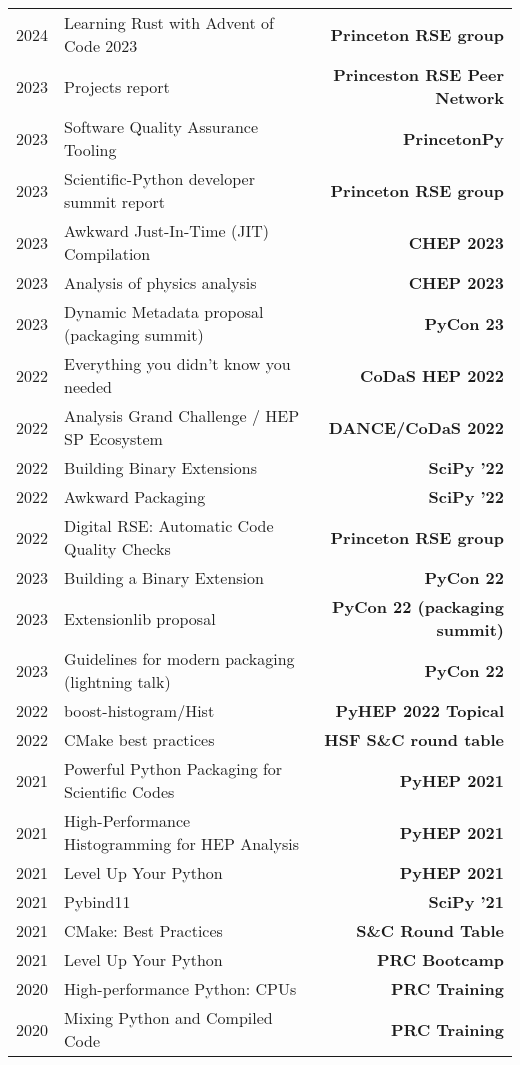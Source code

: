 \documentclass[10pt,letterpaper]{moderncv}
\begin{document}
\begin{tabularx}{\textwidth}{p{.33in}X>{\bfseries}r}
    2024 & Learning Rust with Advent of Code 2023 & Princeton RSE group \\
    2023 & Projects report & Princeston RSE Peer Network \\
    2023 & Software Quality Assurance Tooling & PrincetonPy \\
    2023 & Scientific-Python developer summit report & Princeton RSE group \\
    2023 & Awkward Just-In-Time (JIT) Compilation & CHEP 2023 \\
    2023 & Analysis of physics analysis & CHEP 2023 \\
    2023 & Dynamic Metadata proposal (packaging summit) & PyCon 23 \\
    2022 & Everything you didn't know you needed & CoDaS HEP 2022 \\
    2022 & Analysis Grand Challenge / HEP SP Ecosystem & DANCE/CoDaS 2022 \\
    2022 & Building Binary Extensions & SciPy '22 \\
    2022 & Awkward Packaging & SciPy '22 \\
    2022 & Digital RSE: Automatic Code Quality Checks & Princeton RSE group \\
    2023 & Building a Binary Extension & PyCon 22 \\
    2023 & Extensionlib proposal & PyCon 22 (packaging summit) \\
    2023 & Guidelines for modern packaging (lightning talk) & PyCon 22 \\
    2022 & boost-histogram/Hist & PyHEP 2022 Topical \\
    2022 & CMake best practices & HSF S\&C round table \\
	2021 & Powerful Python Packaging for Scientific Codes & PyHEP 2021 \\
	2021 & High-Performance Histogramming for HEP Analysis & PyHEP 2021 \\
	2021 & Level Up Your Python & PyHEP 2021 \\
	2021 & Pybind11 & SciPy '21 \\
    2021 & CMake: Best Practices & S\&C Round Table \\
    2021 & Level Up Your Python & PRC Bootcamp \\
    2020 & High-performance Python: CPUs & PRC Training \\
    2020 & Mixing Python and Compiled Code & PRC Training \\

\end{tabularx}
\end{document}
